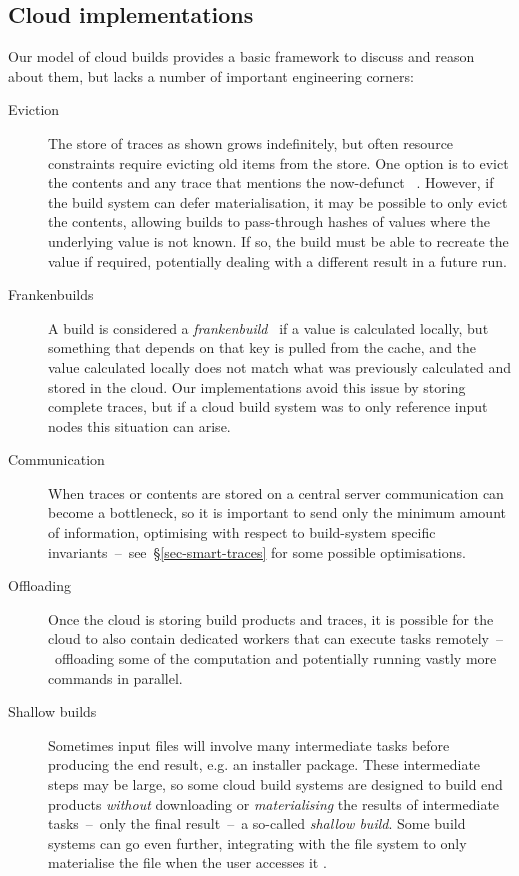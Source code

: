 \subsection{Cloud implementations}\label{sec-cloud-aspects}

Our model of cloud builds provides a basic framework to discuss and reason about them, but lacks a number of important engineering corners:

\begin{description}
\item[Eviction] The store of traces as shown grows indefinitely, but often
resource constraints require evicting old items from the store. One option is
to evict the contents and any trace that mentions the now-defunct
~. However, if the build system can defer materialisation, it
may be possible to only evict the contents, allowing builds to pass-through
hashes of values where the underlying value is not known. If so, the build must
be able to recreate the value if required, potentially dealing with a different
result in a future run.

\item[Frankenbuilds] A build is considered a
\emph{frankenbuild}~\cite{esfahani2016cloudbuild} if a value is calculated
locally, but something that depends on that key is pulled from the cache, and
the value calculated locally does not match what was previously calculated and
stored in the cloud. Our implementations avoid this issue by storing complete
traces, but if a cloud build system was to only reference input nodes this
situation can arise.

\item[Communication] When traces or contents are stored on a central server
communication can become a bottleneck, so it is important to send only the
minimum amount of information, optimising with respect to build-system specific
invariants~--~see~\S\ref{sec-smart-traces} for some possible optimisations.

\item[Offloading] Once the cloud is storing build products and traces, it is
possible for the cloud to also contain dedicated workers that can execute tasks
remotely~--~offloading some of the computation and potentially running vastly
more commands in parallel.

\item[Shallow builds] Sometimes input files will involve many intermediate tasks
before producing the end result, e.g. an installer package. These intermediate
steps may be large, so some cloud build systems are designed to build end
products \emph{without} downloading or \emph{materialising} the results of
intermediate tasks~--~only the final result~--~a so-called \emph{shallow build}.
Some build systems can go even further, integrating with the file system to only
materialise the file when the user accesses it \cite{gvfs}.
\end{description}

